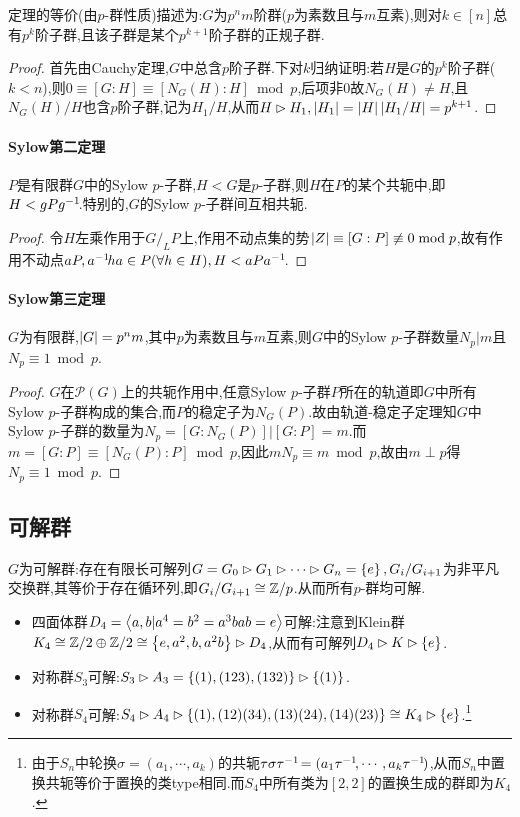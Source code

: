 \documentclass{article}
\begin{document}
定理的等价(由$p$-群性质)描述为:$G$为$p^nm$阶群($p$为素数且与$m$互素),则对$k\in [n]$总有$p^k$阶子群,且该子群是某个$p^{k+1}$阶子群的正规子群.

\begin{proof}
    首先由Cauchy定理,$G$中总含$p$阶子群.下对$k$归纳证明:若$H$是$G$的$p^k$阶子群($k<n$),则$0\equiv [G:H]\equiv [N_G(H):H]\bmod p$,后项非0故$N_G(H)\neq H$,且$N_G(H)/H$也含$p$阶子群,记为$H_1/H$,从而$H\rhd H_1, \left|H_1\right|=\left|H\right|\left|H_1/H\right|=p^{k+1}$.
\end{proof}

\paragraph{Sylow第二定理}
$P$是有限群$G$中的Sylow $p$-子群,$H<G$是$p$-子群,则$H$在$P$的某个共轭中,即$H<gPg^{-1}\!$.特别的,$G$的Sylow $p$-子群间互相共轭.
\begin{proof}
    令$H$左乘作用于$G/_LP$上,作用不动点集的势$\left|Z\right|\equiv [G:P]\not\equiv 0\bmod p$,故有作用不动点$aP, a^{-1}\! ha\in P(\forall h\in H), H<aPa^{-1}\!$.
\end{proof}

\paragraph{Sylow第三定理}
$G$为有限群,$\left|G\right|=p^nm$,其中$p$为素数且与$m$互素,则$G$中的Sylow $p$-子群数量$N_p|m$且$N_p\equiv 1\bmod p$.
\begin{proof}
    $G$在$\mathcal{P}(G)$上的共轭作用中,任意Sylow $p$-子群$P$所在的轨道即$G$中所有Sylow $p$-子群构成的集合,而$P$的稳定子为$N_G(P)$.故由轨道-稳定子定理知$G$中Sylow $p$-子群的数量为$N_p=[G:N_G(P)]|[G:P]=m$.而$m=[G:P]\equiv [N_G(P):P]\bmod p$,因此$mN_p\equiv m\bmod p$,故由$m\perp p$得$N_p\equiv 1\bmod p$.
\end{proof}

\subsection{可解群}
$G$为可解群:存在有限长可解列$G=G_0\rhd G_1\rhd\cdots\rhd G_n=\left\{e\right\}, G_i/G_{i+1}$为非平凡交换群,其等价于存在循环列,即$G_i/G_{i+1}\cong\mathbb{Z}/p$.从而所有$p$-群均可解.
\begin{itemize}
    \item 四面体群$D_4=\left<a,b|a^4=b^2=a^3bab=e\right>$可解:注意到Klein群$K_4\cong\mathbb{Z}/2\oplus\mathbb{Z}/2\cong\left\{e,a^2,b,a^2b\right\}\rhd D_4$,从而有可解列$D_4\rhd K\rhd \left\{e\right\}$.
    \item 对称群$S_3$可解:$S_3\rhd A_3=\left\{(1),(123),(132)\right\}\rhd \left\{(1)\right\}$.
    \item 对称群$S_4$可解:$S_4\rhd A_4\rhd \left\{(1),(12)(34),(13)(24),(14)(23)\right\}\cong K_4\rhd \left\{e\right\}$.\footnote{由于$S_n$中轮换$\sigma=(a_1,\cdots,a_k)$的共轭$\tau\sigma\tau^{-1}\!=(a_1\tau^{-1}\!,\cdots,a_k\tau^{-1}\!)$,从而$S_n$中置换共轭等价于置换的类type相同.而$S_4$中所有类为$[2,2]$的置换生成的群即为$K_4$.}
\end{itemize}
\end{document}
